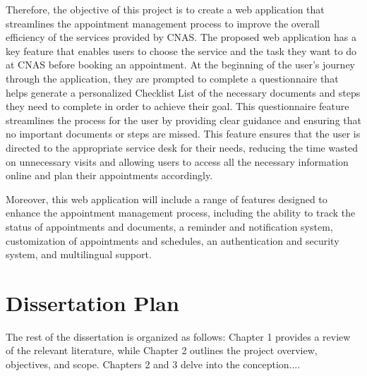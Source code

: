 Therefore, the objective of this project is to create a web application that streamlines the appointment management process to improve the overall efficiency of the services provided by CNAS. The proposed web application has a key feature that enables users to choose the service and the task they want to do at CNAS before booking an appointment. At the beginning of the user's journey through the application, they are prompted to complete a questionnaire that helps generate a personalized Checklist List of the necessary documents and steps they need to complete in order to achieve their goal. This questionnaire feature streamlines the process for the user by providing clear guidance and ensuring that no important documents or steps are missed. This feature ensures that the user is directed to the appropriate service desk for their needs, reducing the time wasted on unnecessary visits and allowing users to access all the necessary information online and plan their appointments accordingly.

Moreover, this web application will include a range of features designed to enhance the appointment management process, including the ability to track the status of appointments and documents, a reminder and notification system, customization of appointments and schedules, an authentication and security system, and multilingual support.


\section{Dissertation Plan}

The rest of the dissertation is organized as follows: Chapter 1 provides a review of the relevant literature, while Chapter 2 outlines the project overview, objectives, and scope. Chapters 2 and 3 delve into the conception.... 

